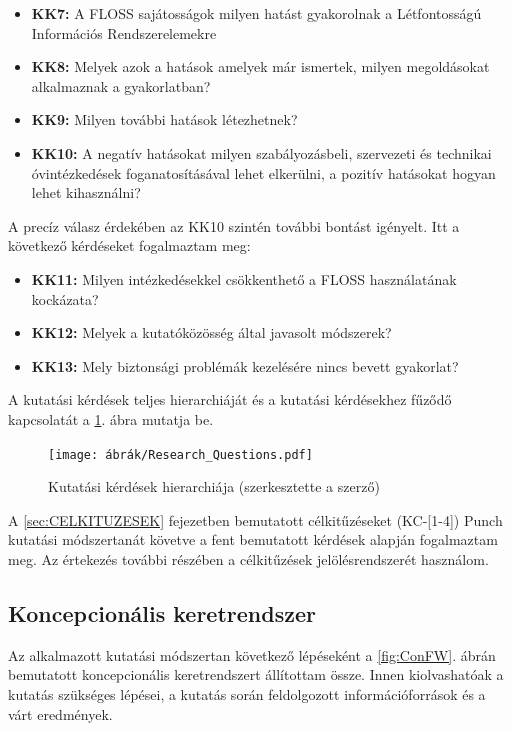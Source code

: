 \documentclass[12pt,magyar,a4paper,oneside]{scrreprt}
\providecommand{\tightlist}{%
  \setlength{\itemsep}{0pt}\setlength{\parskip}{0pt}}
\begin{document}
\begin{itemize}
\tightlist
\item
  \textbf{KK7:} A FLOSS sajátosságok milyen hatást gyakorolnak a
  Létfontosságú Információs Rendszerelemekre
\item
  \textbf{KK8:} Melyek azok a hatások amelyek már ismertek, milyen
  megoldásokat alkalmaznak a gyakorlatban?
\item
  \textbf{KK9:} Milyen további hatások létezhetnek?
\item
  \textbf{KK10:} A negatív hatásokat milyen szabályozásbeli, szervezeti
  és technikai óvintézkedések foganatosításával lehet elkerülni, a
  pozitív hatásokat hogyan lehet kihasználni?
\end{itemize}

A precíz válasz érdekében az KK10 szintén további bontást igényelt. Itt
a következő kérdéseket fogalmaztam meg:

\begin{itemize}
\tightlist
\item
  \textbf{KK11:} Milyen intézkedésekkel csökkenthető a FLOSS
  használatának kockázata?
\item
  \textbf{KK12:} Melyek a kutatóközösség által javasolt módszerek?
\item
  \textbf{KK13:} Mely biztonsági problémák kezelésére nincs bevett
  gyakorlat?
\end{itemize}

A kutatási kérdések teljes hierarchiáját és a kutatási kérdésekhez
fűződő kapcsolatát a \ref{fig:KK}. ábra mutatja be.

\begin{figure}
\hypertarget{fig:KK}{%
\centering
\texttt{[image: ábrák/Research\_Questions.pdf]}
\caption{Kutatási kérdések hierarchiája (szerkesztette a
szerző)}\label{fig:KK}
}
\end{figure}

A \ref{sec:CELKITUZESEK} fejezetben bemutatott célkitűzéseket
(KC-{[}1-4{]}) Punch kutatási módszertanát követve a fent bemutatott
kérdések alapján fogalmaztam meg. Az értekezés további részében a
célkitűzések jelölésrendszerét használom.

\hypertarget{koncepcionuxe1lis-keretrendszer}{%
\subsection{Koncepcionális
keretrendszer}\label{koncepcionuxe1lis-keretrendszer}}

Az alkalmazott kutatási módszertan következő lépéseként a
\ref{fig:ConFW}. ábrán bemutatott koncepcionális keretrendszert
állítottam össze. Innen kiolvashatóak a kutatás szükséges lépései, a
kutatás során feldolgozott információforrások és a várt eredmények.
\end{document}

